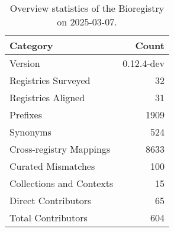 \begin{table}
\caption{Overview statistics of the Bioregistry on 2025-03-07.}
\label{tab:bioregistry-summary}
\begin{tabular}{lr}
\toprule
Category & Count \\
\midrule
Version & 0.12.4-dev \\
Registries Surveyed & 32 \\
Registries Aligned & 31 \\
Prefixes & 1909 \\
Synonyms & 524 \\
Cross-registry Mappings & 8633 \\
Curated Mismatches & 100 \\
Collections and Contexts & 15 \\
Direct Contributors & 65 \\
Total Contributors & 604 \\
\bottomrule
\end{tabular}
\end{table}
